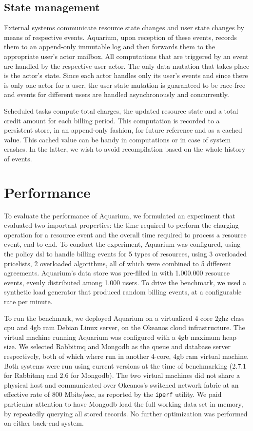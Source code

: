 \documentclass[preprint,10pt]{sigplanconf}
\begin{document}
\subsection{State management}

External systems communicate resource state changes and user state changes by means of respective events. Aquarium, upon reception of these events, records them to an append-only immutable log and then forwards them to the appropriate user's actor mailbox. All computations that are triggered by an event are handled by the respective user actor. The only data mutation that takes place is the actor's state. Since each actor handles only its user's events and since there is only one actor for a user, the user state mutation is guaranteed to be race-free and events for different users are handled asynchronously and concurrently.

Scheduled tasks compute total charges, the updated resource state and a total credit amount for each billing period. This computation is recorded to a persistent store, in an append-only fashion, for future reference and as a cached value. This cached value can be handy in computations or in case of system crashes. In the latter, we wish to avoid recompilation based on the whole history of events.

\section{Performance}

To evaluate the performance of Aquarium, we formulated an experiment that
evaluated two important properties: the time required to perform the charging
operation for a resource event and the overall time required to process a
resource event, end to end. To conduct the experiment, Aquarium was configured,
using the policy {\sc dsl} to handle billing events for 5 types of resources,
using 3 overloaded pricelists, 2 overloaded algorithms, all of which were
combined to 5 different agreements. Aquarium's data store was pre-filled in
with 1.000.000 resource events, evenly distributed among 1.000 users. To drive
the benchmark, we used a synthetic load generator that produced random
billing events, at a configurable rate per minute. 

To run the benchmark, we deployed Aquarium on a virtualized 4 core 2{\sc gh}z
class {\sc cpu} and 4{\sc gb} {\sc ram} Debian Linux server, on the Okeanos
cloud infrastructure. The virtual machine running Aquarium was configured with
a 4{\sc gb} maximum heap size. We selected Rabbit{\sc mq} and Mongo{\sc db} as
the queue and database server respectively, both of which where run in another
4-core, 4{\sc gb ram} virtual machine. Both systems were run using current
versions at the time of benchmarking (2.7.1 for Rabbit{\sc mq} and 2.6 for
Mongo{\sc db}). The two virtual machines did not share a physical host and
communicated over Okeanos's switched network fabric at an effective rate of 800
Mbits/sec, as reported by the \texttt{iperf} utility.  We paid particular
attention to have Mongo{\sc db} load the full working data set in memory, by
repeatedly querying all stored records. No further optimization was performed
on either back-end system.
\end{document}
